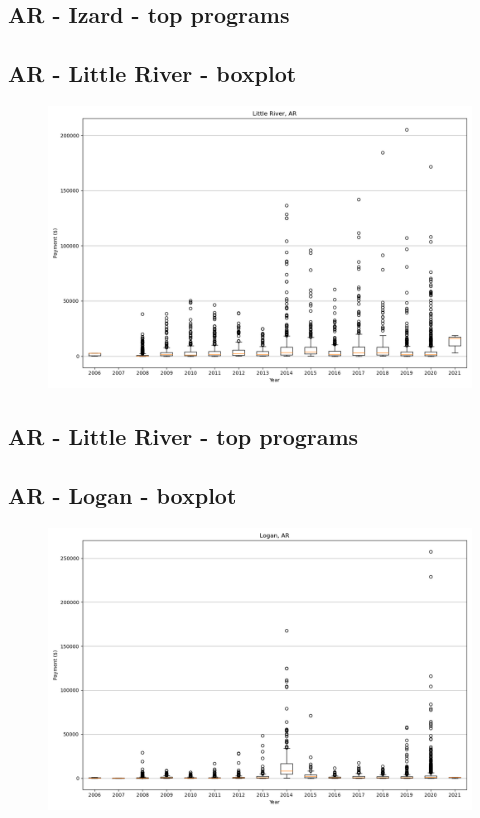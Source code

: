 \subsection*{AR - Izard - top programs}

\newpage
\subsection*{AR - Little River - boxplot}
\begin{figure}[h]
\centering
\includegraphics[width=7in]{../output/boxplots/counties/Little River-AR_boxplot.png}
\end{figure}


\subsection*{AR - Little River - top programs}

\newpage
\subsection*{AR - Logan - boxplot}
\begin{figure}[h]
\centering
\includegraphics[width=7in]{../output/boxplots/counties/Logan-AR_boxplot.png}
\end{figure}


